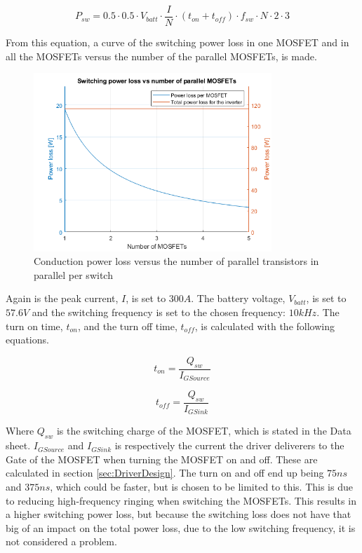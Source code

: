     \begin{equation}
        P_{sw} = 0.5 \cdot 0.5 \cdot V_{batt} \cdot \frac{I}{N} \cdot (t_{on}+t_{off}) \cdot f_{sw} \cdot N \cdot 2 \cdot 3
        \label{eq:sw_loss}
    \end{equation}
    
From this equation, a curve of the switching power loss in one MOSFET and in all the MOSFETs versus the number of the parallel MOSFETs, is made.

    \begin{figure}[H]
		\centering
		\includegraphics[width=0.8\textwidth]{pictures/hardware/Power_Board/Switch_loss.png}
		\caption{Conduction power loss versus the number of parallel transistors in parallel per switch}
		\label{fig:sw_loss}
	\end{figure}
	
Again is the peak current, $I$, is set to $300 A$. The battery voltage, $V_{batt}$, is set to $57.6 V$ and the switching frequency is set to the chosen frequency: $10 kHz$. The turn on time, $t_{on}$, and the turn off time, $t_{off}$, is calculated with the following equations.

    \begin{equation}
        t_{on} = \frac{Q_{sw}}{I_{GSource}}
    \end{equation}
    
    \begin{equation}
        t_{off} = \frac{Q_{sw}}{I_{GSink}}
    \end{equation}
    
Where $Q_{sw}$ is the switching charge of the MOSFET, which is stated in the Data sheet.\cite{mosfet}
$I_{GSource}$ and $I_{GSink}$ is respectively the current the driver deliverers to the Gate of the MOSFET when turning the MOSFET on and off. These are calculated in section \ref{sec:DriverDesign}. The turn on and off end up being $75 ns$ and $375 ns$, which could be faster, but is chosen to be limited to this. This is due to reducing high-frequency ringing when switching the MOSFETs. This results in a higher switching power loss, but because the switching loss does not have that big of an impact on the total power loss, due to the low switching frequency, it is not considered a problem.

